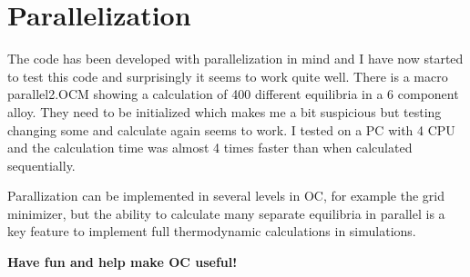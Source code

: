 \documentclass[12pt]{article}
\begin{document}
\section{Parallelization}

The code has been developed with parallelization in mind and I have
now started to test this code and surprisingly it seems to work quite
well.  There is a macro parallel2.OCM showing a calculation of 400
different equilibria in a 6 component alloy.  They need to be
initialized which makes me a bit suspicious but testing changing some
and calculate again seems to work.  I tested on a PC with 4 CPU and
the calculation time was almost 4 times faster than when calculated
sequentially.

Parallization can be implemented in several levels in OC, for example
the grid minimizer, but the ability to calculate many separate
equilibria in parallel is a key feature to implement full
thermodynamic calculations in simulations.

\bigskip

{\large \bf Have fun and help make OC useful!}
\end{document}
